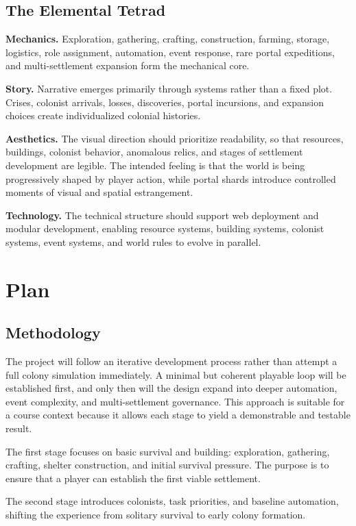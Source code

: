 \documentclass[conference]{IEEEtran}
\begin{document}
\subsection{The Elemental Tetrad}
\textbf{Mechanics.} Exploration, gathering, crafting, construction, farming, storage, logistics, role assignment, automation, event response, rare portal expeditions, and multi-settlement expansion form the mechanical core.

\textbf{Story.} Narrative emerges primarily through systems rather than a fixed plot. Crises, colonist arrivals, losses, discoveries, portal incursions, and expansion choices create individualized colonial histories.

\textbf{Aesthetics.} The visual direction should prioritize readability, so that resources, buildings, colonist behavior, anomalous relics, and stages of settlement development are legible. The intended feeling is that the world is being progressively shaped by player action, while portal shards introduce controlled moments of visual and spatial estrangement.

\textbf{Technology.} The technical structure should support web deployment and modular development, enabling resource systems, building systems, colonist systems, event systems, and world rules to evolve in parallel.

\section{Plan}
\subsection{Methodology}
The project will follow an iterative development process rather than attempt a full colony simulation immediately. A minimal but coherent playable loop will be established first, and only then will the design expand into deeper automation, event complexity, and multi-settlement governance. This approach is suitable for a course context because it allows each stage to yield a demonstrable and testable result.

The first stage focuses on basic survival and building: exploration, gathering, crafting, shelter construction, and initial survival pressure. The purpose is to ensure that a player can establish the first viable settlement.

The second stage introduces colonists, task priorities, and baseline automation, shifting the experience from solitary survival to early colony formation.
\end{document}
